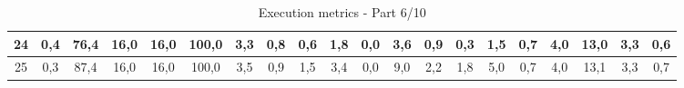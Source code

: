 \begin{sidewaystable}[]
\begin{tabular}{|c|c|c|c|c|c|c|c|c|c|c|c|c|c|c|c|c|c|c|c|}
    24 & 0,4                                              & 76,4                                            & 16,0                                            & 16,0                                            & 100,0                                           & 3,3                                             & 0,8                                             & 0,6                                             & 1,8                                             & 0,0                                             & 3,6                                              & 0,9                                              & 0,3                                              & 1,5                                              & 0,7                                              & 4,0                                              & 13,0                                             & 3,3                                              & 0,6                                              \\ \hline
    25 & 0,3                                              & 87,4                                            & 16,0                                            & 16,0                                            & 100,0                                           & 3,5                                             & 0,9                                             & 1,5                                             & 3,4                                             & 0,0                                             & 9,0                                              & 2,2                                              & 1,8                                              & 5,0                                              & 0,7                                              & 4,0                                              & 13,1                                             & 3,3                                              & 0,7                                              \\ \hline
    \end{tabular}
    \caption{Execution metrics - Part 6/10}
    \label{tab:ap:exec_metrics_6}
\end{sidewaystable}

